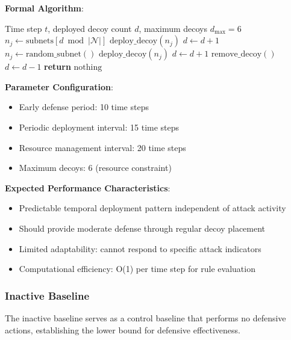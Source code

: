 \documentclass[12pt,oneside]{article}
\begin{document}
\textbf{Formal Algorithm}:
\begin{algorithm}[H]
\caption{Rule-Based Temporal Defense}
\label{alg:rule_baseline}
\begin{algorithmic}[1]
\REQUIRE Time step $t$, deployed decoy count $d$, maximum decoys $d_{\text{max}} = 6$
    \STATE $n_j \leftarrow \text{subnets}[d \bmod |\mathcal{N}|]$ 
    \STATE $\text{deploy\_decoy}(n_j)$
    \STATE $d \leftarrow d + 1$
    \STATE $n_j \leftarrow \text{random\_subnet}()$ 
    \STATE $\text{deploy\_decoy}(n_j)$
    \STATE $d \leftarrow d + 1$
    \STATE $\text{remove\_decoy}()$ 
    \STATE $d \leftarrow d - 1$
\ELSE
    \STATE \textbf{return} $\text{nothing}$ 
\ENDIF
\end{algorithmic}
\end{algorithm}

\textbf{Parameter Configuration}:
\begin{itemize}
    \item Early defense period: 10 time steps
    \item Periodic deployment interval: 15 time steps
    \item Resource management interval: 20 time steps
    \item Maximum decoys: 6 (resource constraint)
\end{itemize}

\textbf{Expected Performance Characteristics}:
\begin{itemize}
    \item Predictable temporal deployment pattern independent of attack activity
    \item Should provide moderate defense through regular decoy placement
    \item Limited adaptability: cannot respond to specific attack indicators
    \item Computational efficiency: O(1) per time step for rule evaluation
\end{itemize}

\subsubsection{Inactive Baseline}

The inactive baseline serves as a control baseline that performs no defensive actions, establishing the lower bound for defensive effectiveness.
\end{document}
